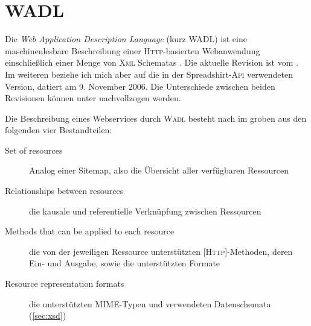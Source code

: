 \section{WADL}
\label{sec:wadl}

Die \emph{Web Application Description Language} (kurz \gls{WADL}) ist eine maschinenlesbare Beschreibung einer \textsc{Http}-basierten Webanwendung einschließlich einer Menge von \textsc{Xml} Schematas \cite{hadleyWADL}.
Die aktuelle Revision ist vom  \cite{WADLcurrent}. Im weiteren beziehe ich mich aber auf die in der Spreadshirt-\textsc{Api} verwendeten Version, datiert am 9. November 2006. Die Unterschiede zwischen beiden Revisionen können unter \cite{WADLchanges} nachvollzogen werden.

Die Beschreibung eines Webservices durch \textsc{Wadl} besteht nach \cite{hadleyWADL} im groben aus den folgenden vier Bestandteilen:
\begin{description}
     \item[Set of resources] Analog einer Sitemap, also die Übersicht aller verfügbaren Ressourcen
     \item[Relationships between resources] die kausale und referentielle Verknüpfung zwischen Ressourcen
     \item[Methods that can be applied to each resource] die von der jeweiligen Ressource unterstützten [\textsc{Http}]-Methoden, deren Ein- und Ausgabe, sowie die unterstützten Formate
     \item[Resource representation formats] die unterstützten \gls{MIME}-Typen und verwendeten Datenschemata (\cref{sec:xsd})
 \end{description} 

